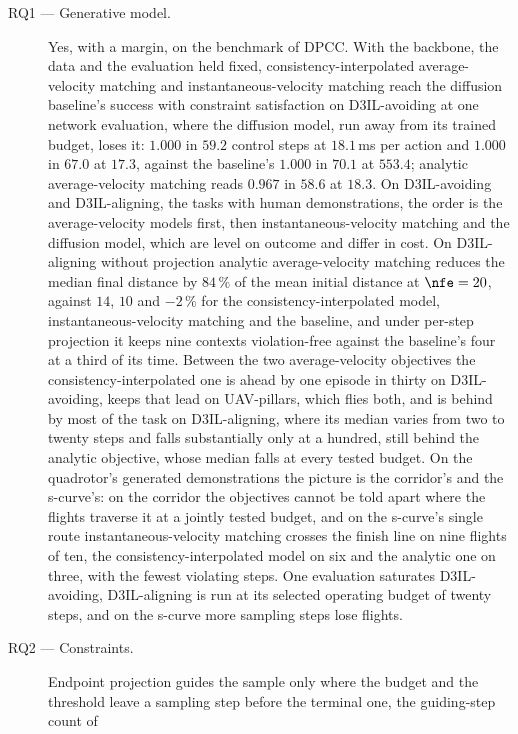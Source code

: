 \begin{description}
  \item[RQ1 --- Generative model.] Yes, with a margin, on the benchmark of \ac{DPCC}. With the
    backbone, the data and the evaluation held fixed, consistency-interpolated average-velocity
    matching and instantaneous-velocity matching reach the diffusion baseline's success with
    constraint satisfaction on D3IL-avoiding at one network evaluation, where the diffusion model,
    run away from its trained budget, loses it: $1.000$ in $59.2$ control steps at $18.1$\,ms per
    action and $1.000$ in $67.0$ at $17.3$, against the baseline's $1.000$ in $70.1$ at $553.4$;
    analytic average-velocity matching reads $0.967$ in $58.6$ at $18.3$. On D3IL-avoiding and
    D3IL-aligning, the tasks with human demonstrations, the order is the average-velocity models
    first, then instantaneous-velocity matching and the diffusion model, which are level on outcome
    and differ in cost. On D3IL-aligning without projection analytic average-velocity matching
    reduces the median final distance by $84\,\%$ of the mean initial distance at $\nfe = 20$,
    against $14$, $10$ and $-2\,\%$ for the consistency-interpolated model, instantaneous-velocity
    matching and the baseline, and under per-step projection it keeps nine contexts violation-free
    against the baseline's four at a third of its time. Between the two average-velocity objectives
    the consistency-interpolated one is ahead by one episode in thirty on D3IL-avoiding, keeps that
    lead on UAV-pillars, which flies both, and is behind by most of the task on D3IL-aligning, where
    its median varies from two to twenty steps and falls substantially only at a hundred, still
    behind the analytic objective, whose median falls at every tested budget. On the quadrotor's
    generated demonstrations the picture is the corridor's and the s-curve's: on the corridor the
    objectives cannot be told apart where the flights traverse it at a jointly tested budget, and on
    the s-curve's single route instantaneous-velocity matching crosses the finish line on nine
    flights of ten, the consistency-interpolated model on six and the analytic one on three, with the
    fewest violating steps. One evaluation saturates D3IL-avoiding, D3IL-aligning is run at its
    selected operating budget of twenty steps, and on the s-curve more sampling steps lose flights.
  \item[RQ2 --- Constraints.] Endpoint projection guides the sample only where the budget and the
    threshold leave a sampling step before the terminal one, the guiding-step count of

\end{description}
